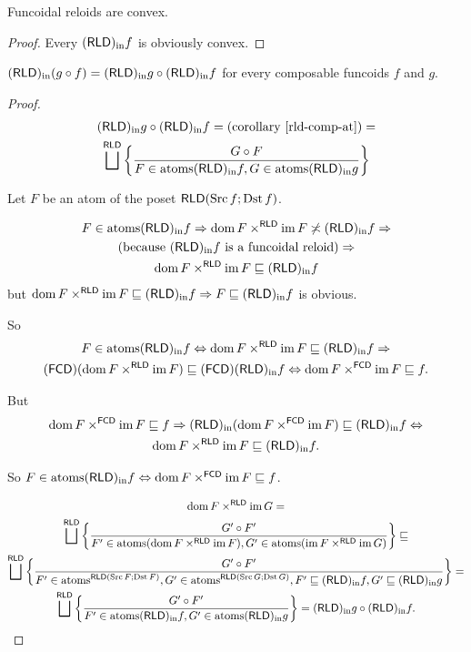 \begin{cor}
Funcoidal reloids are convex.\end{cor}
\begin{proof}
Every $\torldin f$ is obviously convex.\end{proof}
\begin{thm}
$\torldin(g\circ f)=\torldin g\circ\torldin f$ for every composable
funcoids $f$ and $g$.\end{thm}
\begin{proof}
~
\begin{multline*}
\torldin g\circ\torldin f=\text{(corollary \ref{rld-comp-at})}=\\
\bigsqcup^{\mathsf{RLD}}\setcond{G\circ F}{F\in\atoms\torldin f,G\in\atoms\torldin g}
\end{multline*}


Let $F$ be an atom of the poset $\mathsf{RLD}(\Src f;\Dst f)$.

\begin{multline*}
F\in\atoms\torldin f\Rightarrow\dom F\times^{\mathsf{RLD}}\im F\nasymp\torldin f\Rightarrow\\
\text{(because \ensuremath{\torldin f} is a funcoidal reloid)}\Rightarrow\\
\dom F\times^{\mathsf{RLD}}\im F\sqsubseteq\torldin f
\end{multline*}
 but $\dom F\times^{\mathsf{RLD}}\im F\sqsubseteq\torldin f\Rightarrow F\sqsubseteq\torldin f$
is obvious.

So 
\begin{multline*}
F\in\atoms\torldin f\Leftrightarrow\dom F\times^{\mathsf{RLD}}\im F\sqsubseteq\torldin f\Rightarrow\\
\tofcd(\dom F\times^{\mathsf{RLD}}\im F)\sqsubseteq\tofcd\torldin f\Leftrightarrow\dom F\times^{\mathsf{FCD}}\im F\sqsubseteq f.
\end{multline*}


But 
\begin{multline*}
\dom F\times^{\mathsf{FCD}}\im F\sqsubseteq f\Rightarrow\torldin(\dom F\times^{\mathsf{FCD}}\im F)\sqsubseteq\torldin f\Leftrightarrow\\
\dom F\times^{\mathsf{RLD}}\im F\sqsubseteq\torldin f.
\end{multline*}


So $F\in\atoms\torldin f\Leftrightarrow\dom F\times^{\mathsf{FCD}}\im F\sqsubseteq f$.

\begin{multline*}
\dom F\times^{\mathsf{RLD}}\im G=\\
\bigsqcup^{\mathsf{RLD}}\setcond{G'\circ F'}{F'\in\atoms(\dom F\times^{\mathsf{RLD}}\im F),G'\in\atoms(\im F\times^{\mathsf{RLD}}\im G)}\sqsubseteq\\
\bigsqcup^{\mathsf{RLD}}\setcond{G'\circ F'}{F'\in\atoms^{\mathsf{RLD}(\Src F;\Dst F)},G'\in\atoms^{\mathsf{RLD}(\Src G;\Dst G)},F'\sqsubseteq\torldin f,G'\sqsubseteq\torldin g}=\\
\bigsqcup^{\mathsf{RLD}}\setcond{G'\circ F'}{F'\in\atoms\torldin f,G'\in\atoms\torldin g}=\torldin g\circ\torldin f.
\end{multline*}



\end{proof}
